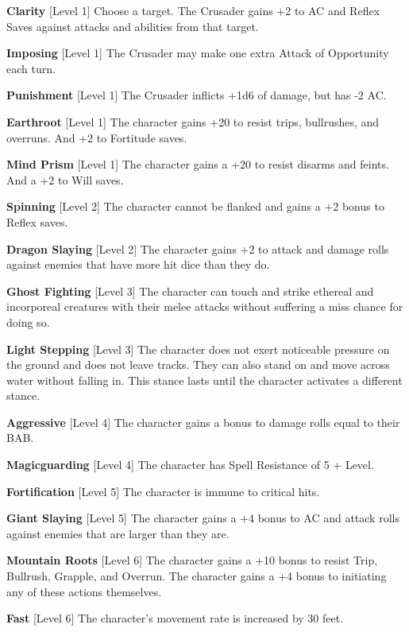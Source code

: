 \newcommand{\crusaderstance}[3]{\textbf{#1} [Level #2] #3\medskip{}}

\crusaderstance{Clarity}{1}{Choose a target. The Crusader gains +2 to AC and Reflex Saves against attacks and abilities from that target.}

\crusaderstance{Imposing}{1}{The Crusader may make one extra Attack of Opportunity each turn.}

\crusaderstance{Punishment}{1}{The Crusader inflicts +1d6 of damage, but has -2 AC.}

\crusaderstance{Earthroot}{1}{The character gains +20 to resist trips, bullrushes, and overruns. And +2 to Fortitude saves.}

\crusaderstance{Mind Prism}{1}{The character gains a +20 to resist disarms and feints. And a +2 to Will saves.}

\crusaderstance{Spinning}{2}{The character cannot be flanked and gains a +2 bonus to Reflex saves.}

\crusaderstance{Dragon Slaying}{2}{The character gains +2 to attack and damage rolls against enemies that have more hit dice than they do.}

\crusaderstance{Ghost Fighting}{3}{The character can touch and strike ethereal and incorporeal creatures with their melee attacks without suffering a miss chance for doing so.}

\crusaderstance{Light Stepping}{3}{The character does not exert noticeable pressure on the ground and does not leave tracks. They can also stand on and move across water without falling in. This stance lasts until the character activates a different stance.}

\crusaderstance{Aggressive}{4}{The character gains a bonus to damage rolls equal to their BAB.}

\crusaderstance{Magicguarding}{4}{The character has Spell Resistance of 5 + Level.}

\crusaderstance{Fortification}{5}{The character is immune to critical hits.}

\crusaderstance{Giant Slaying}{5}{The character gains a +4 bonus to AC and attack rolls against enemies that are larger than they are.}

\crusaderstance{Mountain Roots}{6}{The character gains a +10 bonus to resist Trip, Bullrush, Grapple, and Overrun. The character gains a +4 bonus to initiating any of these actions themselves.}

\crusaderstance{Fast}{6}{The character's movement rate is increased by 30 feet.}

